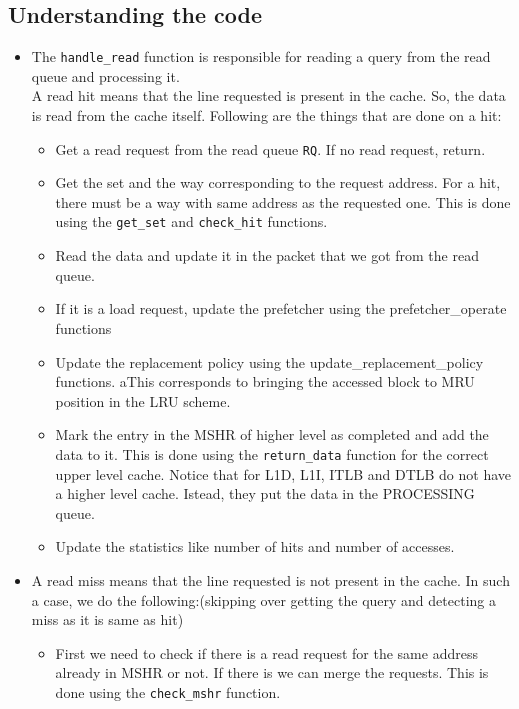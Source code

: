 \documentclass[11pt, swedish, openany]{book}
\begin{document}
\subsection{Understanding the code}
\begin{itemize}
    \item The \texttt{handle\_read} function is responsible for reading a query from the read queue and processing it.\\
    A read hit means that the line requested is present in the cache. So, the data is read from the cache itself. Following are the things that are done on a hit:
    \begin{itemize}
        \item Get a read request from the read queue \texttt{RQ}. If no read request, return.
        \item Get the set and the way corresponding to the request address. For a hit, there must be a way with same address as the requested one. This is done using the \texttt{get\_set} and \texttt{check\_hit} functions.
        \item Read the data and update it in the packet that we got from the read queue.
        \item If it is a load request, update the prefetcher using the prefetcher\_operate functions
        \item Update the replacement policy using the update\_replacement\_policy functions. aThis corresponds to bringing the accessed block to MRU position in the LRU scheme.
        \item Mark the entry in the MSHR of higher level as completed and add the data to it. This is done using the \texttt{return\_data} function for the correct upper level cache. Notice that for L1D, L1I, ITLB and DTLB do not have a higher level cache. Istead, they put the data in the PROCESSING queue.
        \item Update the statistics like number of hits and number of accesses.
    \end{itemize}
    \item A read miss means that the line requested is not present in the cache. In such a case, we do the following:(skipping over getting the query and detecting a miss as it is same as hit)
    \begin{itemize}
        \item First we need to check if there is a read request for the same address already in MSHR or not. If there is we can merge the requests. This is done using the \texttt{check\_mshr} function.

\end{itemize}
\end{itemize}
\end{document}
